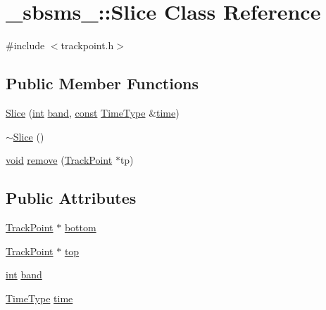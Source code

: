 \hypertarget{class__sbsms___1_1_slice}{}\section{\+\_\+sbsms\+\_\+\+:\+:Slice Class Reference}
\label{class__sbsms___1_1_slice}


{\ttfamily \#include $<$trackpoint.\+h$>$}

\subsection*{Public Member Functions}
\begin{DoxyCompactItemize}
\item 
\hyperlink{class__sbsms___1_1_slice_a6245bb410bb09dd9c47a0f0faee6cef7}{Slice} (\hyperlink{xmltok_8h_a5a0d4a5641ce434f1d23533f2b2e6653}{int} \hyperlink{class__sbsms___1_1_slice_afb7207c32d82e54c23e3513911d77033}{band}, \hyperlink{getopt1_8c_a2c212835823e3c54a8ab6d95c652660e}{const} \hyperlink{namespace__sbsms___a3a161c3deff71e932c0ec86aad54eb7c}{Time\+Type} \&\hyperlink{class__sbsms___1_1_slice_a6db6a21e4d624e41a776479d1b4cd945}{time})
\item 
\hyperlink{class__sbsms___1_1_slice_aac785c498585c453d385d3875e63a63a}{$\sim$\+Slice} ()
\item 
\hyperlink{sound_8c_ae35f5844602719cf66324f4de2a658b3}{void} \hyperlink{class__sbsms___1_1_slice_a9ebc840f933e4e99e473d5381737403e}{remove} (\hyperlink{class__sbsms___1_1_track_point}{Track\+Point} $\ast$tp)
\end{DoxyCompactItemize}
\subsection*{Public Attributes}
\begin{DoxyCompactItemize}
\item 
\hyperlink{class__sbsms___1_1_track_point}{Track\+Point} $\ast$ \hyperlink{class__sbsms___1_1_slice_a4baf69ff7c435f483065a33debadb35c}{bottom}
\item 
\hyperlink{class__sbsms___1_1_track_point}{Track\+Point} $\ast$ \hyperlink{class__sbsms___1_1_slice_a920cc2ff120fac53654c384aeb8b6826}{top}
\item 
\hyperlink{xmltok_8h_a5a0d4a5641ce434f1d23533f2b2e6653}{int} \hyperlink{class__sbsms___1_1_slice_afb7207c32d82e54c23e3513911d77033}{band}
\item 
\hyperlink{namespace__sbsms___a3a161c3deff71e932c0ec86aad54eb7c}{Time\+Type} \hyperlink{class__sbsms___1_1_slice_a6db6a21e4d624e41a776479d1b4cd945}{time}
\end{DoxyCompactItemize}


